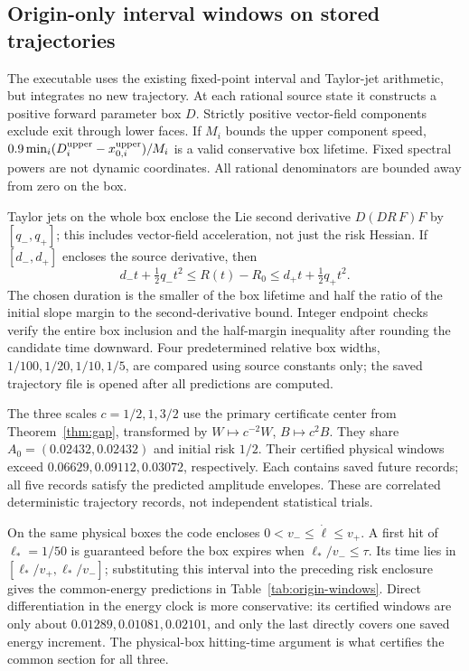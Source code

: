 

\subsection{Origin-only interval windows on stored trajectories}
\label{app:origin-windows}
The executable  uses the existing fixed-point interval and Taylor-jet arithmetic, but integrates no new trajectory. At each rational source state it constructs a positive forward parameter box $D$. Strictly positive vector-field components exclude exit through lower faces. If $M_i$ bounds the upper component speed, $0.9\min_i(D_i^{\rm upper}-x_{0,i}^{\rm upper})/M_i$ is a valid conservative box lifetime. Fixed spectral powers are not dynamic coordinates. All rational denominators are bounded away from zero on the box.

Taylor jets on the whole box enclose the Lie second derivative $D(DR\,F)F$ by $[q_-,q_+]$; this includes vector-field acceleration, not just the risk Hessian. If $[d_-,d_+]$ encloses the source derivative, then
\begin{equation}
 d_-t+\tfrac12q_-t^2\le R(t)-R_0
 \le d_+t+\tfrac12q_+t^2.
\end{equation}
The chosen duration is the smaller of the box lifetime and half the ratio of the initial slope margin to the second-derivative bound. Integer endpoint checks verify the entire box inclusion and the half-margin inequality after rounding the candidate time downward. Four predetermined relative box widths, $1/100,1/20,1/10,1/5$, are compared using source constants only; the saved trajectory file is opened after all predictions are computed.

The three scales $c=1/2,1,3/2$ use the primary certificate center from Theorem~\ref{thm:gap}, transformed by $W\mapsto c^{-2}W$, $B\mapsto c^2B$. They share $A_0=(0.02432,0.02432)$ and initial risk $1/2$. Their certified physical windows exceed $0.06629,0.09112,0.03072$, respectively. Each contains saved future records; all five records satisfy the predicted amplitude envelopes. These are correlated deterministic trajectory records, not independent statistical trials.

On the same physical boxes the code encloses $0<v_-\le\dot\ell\le v_+$. A first hit of $\ell_*=1/50$ is guaranteed before the box expires when $\ell_*/v_-\le\tau$. Its time lies in $[\ell_*/v_+,\ell_*/v_-]$; substituting this interval into the preceding risk enclosure gives the common-energy predictions in Table~\ref{tab:origin-windows}. Direct differentiation in the energy clock is more conservative: its certified windows are only about $0.01289,0.01081,0.02101$, and only the last directly covers one saved energy increment. The physical-box hitting-time argument is what certifies the common section for all three.

